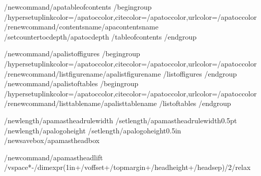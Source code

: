 /newcommand{/apatableofcontents}{%
  /begingroup
  /hypersetup{linkcolor=/apatoccolor,citecolor=/apatoccolor,urlcolor=/apatoccolor}%
  /renewcommand{/contentsname}{/apacontentsname}%
  /setcounter{tocdepth}{/apatocdepth}%
  /tableofcontents
  /endgroup}

/newcommand{/apalistoffigures}{%
  /begingroup
  /hypersetup{linkcolor=/apatoccolor,citecolor=/apatoccolor,urlcolor=/apatoccolor}%
  /renewcommand{/listfigurename}{/apalistfigurename}%
  /listoffigures
  /endgroup}
/newcommand{/apalistoftables}{%
  /begingroup
  /hypersetup{linkcolor=/apatoccolor,citecolor=/apatoccolor,urlcolor=/apatoccolor}%
  /renewcommand{/listtablename}{/apalisttablename}%
  /listoftables
  /endgroup}

%
/newlength{/apamastheadrulewidth}
/setlength{/apamastheadrulewidth}{0.5pt}
/newlength{/apalogoheight}
/setlength{/apalogoheight}{0.5in}
/newsavebox{/apamastheadbox}

%
/newcommand{/apamastheadlift}{%
  /vspace*{-/dimexpr(1in+/voffset+/topmargin+/headheight+/headsep)/2/relax}}

